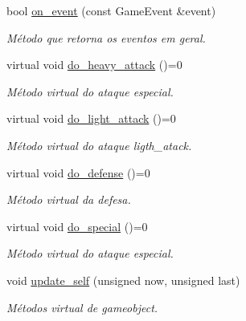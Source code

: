 \begin{DoxyCompactItemize}
bool \mbox{\hyperlink{classCharacter_a92d3a1ad2ceba203bf72584c4c4029d7}{on\+\_\+event}} (const Game\+Event \&event)
\begin{DoxyCompactList}\small\item\em Método que retorna os eventos em geral. \end{DoxyCompactList}\item 
\mbox{\label{classCharacter_aa9b20c9c53393c7aaf3a45e5c966c2ef}} 
virtual void \mbox{\hyperlink{classCharacter_aa9b20c9c53393c7aaf3a45e5c966c2ef}{do\+\_\+heavy\+\_\+attack}} ()=0
\begin{DoxyCompactList}\small\item\em Método virtual do ataque especial. \end{DoxyCompactList}\item 
\mbox{\label{classCharacter_ae45be8b8b1a7d2f54a2349a65e2e6c42}} 
virtual void \mbox{\hyperlink{classCharacter_ae45be8b8b1a7d2f54a2349a65e2e6c42}{do\+\_\+light\+\_\+attack}} ()=0
\begin{DoxyCompactList}\small\item\em Método virtual do ataque ligth\+\_\+atack. \end{DoxyCompactList}\item 
\mbox{\label{classCharacter_ad8a87c4397e38fd4bd88c93a3d3cb70a}} 
virtual void \mbox{\hyperlink{classCharacter_ad8a87c4397e38fd4bd88c93a3d3cb70a}{do\+\_\+defense}} ()=0
\begin{DoxyCompactList}\small\item\em Método virtual da defesa. \end{DoxyCompactList}\item 
\mbox{\label{classCharacter_a447eb9fa4afa57619d6387e0ea178f93}} 
virtual void \mbox{\hyperlink{classCharacter_a447eb9fa4afa57619d6387e0ea178f93}{do\+\_\+special}} ()=0
\begin{DoxyCompactList}\small\item\em Método virtual do ataque especial. \end{DoxyCompactList}\item 
void \mbox{\hyperlink{classCharacter_a94242f85f3afb3f12dd92e02797345bd}{update\+\_\+self}} (unsigned now, unsigned last)
\begin{DoxyCompactList}\small\item\em Métodos virtual de gameobject. \end{DoxyCompactList}\item 

\end{DoxyCompactItemize}
